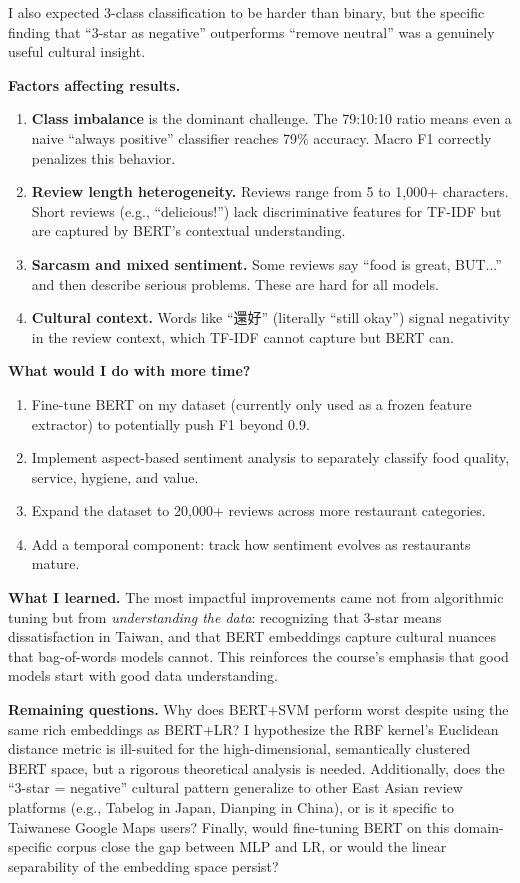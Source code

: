 \documentclass[12pt]{article}
\begin{document}
I also expected 3-class classification to be harder than binary, but the specific finding that ``3-star as negative'' outperforms ``remove neutral'' was a genuinely useful cultural insight.

\textbf{Factors affecting results.}
\begin{enumerate}[nosep]
  \item \textbf{Class imbalance} is the dominant challenge.
    The 79:10:10 ratio means even a naive ``always positive'' classifier reaches 79\% accuracy.
    Macro F1 correctly penalizes this behavior.
  \item \textbf{Review length heterogeneity.}
    Reviews range from 5 to 1{,}000+ characters.
    Short reviews (e.g., ``delicious!'') lack discriminative features for TF-IDF but are captured by BERT's contextual understanding.
  \item \textbf{Sarcasm and mixed sentiment.}
    Some reviews say ``food is great, BUT...'' and then describe serious problems.
    These are hard for all models.
  \item \textbf{Cultural context.}
    Words like ``還好'' (literally ``still okay'') signal negativity in the review context, which TF-IDF cannot capture but BERT can.
\end{enumerate}

\textbf{What would I do with more time?}
\begin{enumerate}[nosep]
  \item Fine-tune BERT on my dataset (currently only used as a frozen feature extractor) to potentially push F1 beyond 0.9.
  \item Implement aspect-based sentiment analysis to separately classify food quality, service, hygiene, and value.
  \item Expand the dataset to 20{,}000+ reviews across more restaurant categories.
  \item Add a temporal component: track how sentiment evolves as restaurants mature.
\end{enumerate}

\textbf{What I learned.}
The most impactful improvements came not from algorithmic tuning but from \textit{understanding the data}: recognizing that 3-star means dissatisfaction in Taiwan, and that BERT embeddings capture cultural nuances that bag-of-words models cannot.
This reinforces the course's emphasis that good models start with good data understanding.

\textbf{Remaining questions.}
Why does BERT+SVM perform worst despite using the same rich embeddings as BERT+LR? I hypothesize the RBF kernel's Euclidean distance metric is ill-suited for the high-dimensional, semantically clustered BERT space, but a rigorous theoretical analysis is needed.
Additionally, does the ``3-star = negative'' cultural pattern generalize to other East Asian review platforms (e.g., Tabelog in Japan, Dianping in China), or is it specific to Taiwanese Google Maps users?
Finally, would fine-tuning BERT on this domain-specific corpus close the gap between MLP and LR, or would the linear separability of the embedding space persist?
\end{document}
